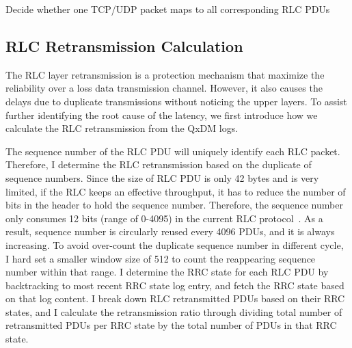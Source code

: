 \begin{algorithm}
\begin{algorithmic}
	\ELSE
    	\ENDIF
    \ENDIF
\ELSE
\ENDIF
\ENDWHILE
{}
	\RETURN \TRUE
\ELSE
	\RETURN \FALSE
\ENDIF
\end{algorithmic}
\caption{Decide whether one TCP/UDP packet maps to all corresponding RLC PDUs}
\label{alg:cross.mapping}
\end{algorithm}

\subsection{RLC Retransmission Calculation}

The RLC layer retransmission is a protection mechanism that maximize the reliability over a loss data transmission channel. However, it also causes the delays due to duplicate transmissions without noticing the upper layers. To assist further identifying the root cause of the latency, we first introduce how we calculate the RLC retransmission from the QxDM logs.

The sequence number of the RLC PDU will uniquely identify each RLC packet. Therefore, I determine the RLC retransmission based on the duplicate of sequence numbers. Since the size of RLC PDU is only 42 bytes and is very limited, if the RLC keeps an effective throughput, it has to reduce the number of bits in the header to hold the sequence number. Therefore, the sequence number only consumes 12 bits (range of 0-4095) in the current RLC protocol~\cite{spec-3G-RLC}. As a result, sequence number is circularly reused every 4096 PDUs, and it is always increasing. To avoid over-count the duplicate sequence number in different cycle, I hard set a smaller window size of 512 to count the reappearing sequence number within that range. I determine the RRC state for each RLC PDU by backtracking to most recent RRC state log entry, and fetch the RRC state based on that log content. I break down RLC retransmitted PDUs based on their RRC states, and I calculate the retransmission ratio through dividing total number of retransmitted PDUs per RRC state by the total number of PDUs in that RRC state. 

